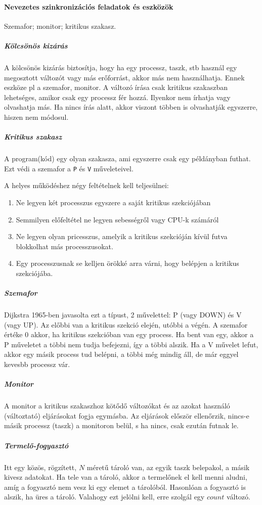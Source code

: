 \documentclass[fleqn,10pt,a4paper]{article}
\newcommand{\ut}[1]{\texttt{#1}}
\theoremstyle{magyar}
\begin{document}
  \paragraph{Nevezetes szinkronizációs feladatok és eszközök}
  Szemafor; monitor; kritikus szakasz.
  
  \subparagraph{Kölcsönös kizárás}
  A kölcsönös kizárás biztosítja, hogy ha egy processz, taszk, stb
  használ egy megosztott változót vagy más erőforrást, akkor más nem
  használhatja. Ennek eszköze pl a szemafor, monitor. A változó írása
  csak kritikus szakaszban lehetséges, amikor csak egy processz fér
  hozzá. Ilyenkor nem írhatja vagy olvashatja más. Ha nincs írás
  alatt, akkor viszont többen is olvashatják egyszerre, hiszen nem módosul.

  \subparagraph{Kritikus szakasz}
  A program(kód) egy olyan szakasza, ami egyszerre csak egy példányban
  futhat. Ezt védi a szemafor a \ut{P} és \ut{V} műveleteivel.

  A helyes működéshez négy feltételnek kell teljesülnei:
  \begin{enumerate}[1.]
  \item  Ne legyen két processzus egyszere a saját kritikus
    szekciójában
  \item Semmilyen előfeltétel ne legyen sebességről vagy CPU-k
    számáról
  \item Ne legyen olyan pricesszus, amelyik a kritikus szekcióján
    kívül futva blokkolhat más processzusokat.
  \item Egy processzusnak se kelljen örökké arra várni, hogy belépjen
    a kritikus szekciójába.
  \end{enumerate}

  \subparagraph{Szemafor}
  Dijkstra 1965-ben javasolta ezt a típust, 2 művelettel: P (vagy
  DOWN) és V (vagy UP). Az előbbi van a kritikus szekció elején,
  utóbbi a végén. A szemafor értéke 0 akkor, ha kritikus szekcióban
  van egy process. Ha bent van egy, akkor a P műveletet a többi nem
  tudja befejezni, így a többi alszik. Ha a V művelet lefut, akkor egy
  másik process tud belépni, a többi még mindig áll, de már eggyel
  kevesbb processz vár.

  \subparagraph{Monitor}
  A monitor a kritikus szakaszhoz kötődő változókat és az azokat
  használó (változtató) eljárásokat fogja egymásba. Az eljárások
  először  ellenőrzik, nincs-e másik processz (taszk) a monitoron
  belül, s ha nincs, csak ezután futnak le.

  \subparagraph{Termelő-fogyasztó}
  Itt egy közös, rögzített, $N$ méretű tároló van, az egyik taszk
  belepakol, a másik kivesz adatokat. Ha tele van a tároló, akkor a
  termelőnek el kell menni aludni, amíg a fogyasztó nem vesz ki egy
  elemet a tárolóból. Hasonlóan a fogyasztó is alszik, ha üres a
  tároló. Valahogy ezt jelölni kell, erre szolgál egy $count$
  változó.
  
\end{document}
